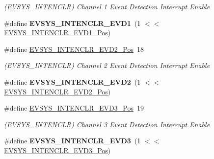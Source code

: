 \begin{DoxyCompactItemize}
\begin{DoxyCompactList}\small\item\em (E\+V\+S\+Y\+S\+\_\+\+I\+N\+T\+E\+N\+C\+L\+R) Channel 1 Event Detection Interrupt Enable \end{DoxyCompactList}\item 
\hypertarget{group___s_a_m_l21___e_v_s_y_s_ga459758c1f1e6bd8a40bab3d9caa23ec8}{}\#define {\bfseries E\+V\+S\+Y\+S\+\_\+\+I\+N\+T\+E\+N\+C\+L\+R\+\_\+\+E\+V\+D1}~(1 $<$$<$ \hyperlink{group___s_a_m_l21___e_v_s_y_s_gabd12d170f66f38972e54314834495117}{E\+V\+S\+Y\+S\+\_\+\+I\+N\+T\+E\+N\+C\+L\+R\+\_\+\+E\+V\+D1\+\_\+\+Pos})\label{group___s_a_m_l21___e_v_s_y_s_ga459758c1f1e6bd8a40bab3d9caa23ec8}

\item 
\hypertarget{group___s_a_m_l21___e_v_s_y_s_ga532eeca3a85b502003b28b968ac30625}{}\#define \hyperlink{group___s_a_m_l21___e_v_s_y_s_ga532eeca3a85b502003b28b968ac30625}{E\+V\+S\+Y\+S\+\_\+\+I\+N\+T\+E\+N\+C\+L\+R\+\_\+\+E\+V\+D2\+\_\+\+Pos}~18\label{group___s_a_m_l21___e_v_s_y_s_ga532eeca3a85b502003b28b968ac30625}

\begin{DoxyCompactList}\small\item\em (E\+V\+S\+Y\+S\+\_\+\+I\+N\+T\+E\+N\+C\+L\+R) Channel 2 Event Detection Interrupt Enable \end{DoxyCompactList}\item 
\hypertarget{group___s_a_m_l21___e_v_s_y_s_gaca8fe60ce667ef8c386033913db0cdb6}{}\#define {\bfseries E\+V\+S\+Y\+S\+\_\+\+I\+N\+T\+E\+N\+C\+L\+R\+\_\+\+E\+V\+D2}~(1 $<$$<$ \hyperlink{group___s_a_m_l21___e_v_s_y_s_ga532eeca3a85b502003b28b968ac30625}{E\+V\+S\+Y\+S\+\_\+\+I\+N\+T\+E\+N\+C\+L\+R\+\_\+\+E\+V\+D2\+\_\+\+Pos})\label{group___s_a_m_l21___e_v_s_y_s_gaca8fe60ce667ef8c386033913db0cdb6}

\item 
\hypertarget{group___s_a_m_l21___e_v_s_y_s_ga9b3a9f98637dea0c9a77145a85c39149}{}\#define \hyperlink{group___s_a_m_l21___e_v_s_y_s_ga9b3a9f98637dea0c9a77145a85c39149}{E\+V\+S\+Y\+S\+\_\+\+I\+N\+T\+E\+N\+C\+L\+R\+\_\+\+E\+V\+D3\+\_\+\+Pos}~19\label{group___s_a_m_l21___e_v_s_y_s_ga9b3a9f98637dea0c9a77145a85c39149}

\begin{DoxyCompactList}\small\item\em (E\+V\+S\+Y\+S\+\_\+\+I\+N\+T\+E\+N\+C\+L\+R) Channel 3 Event Detection Interrupt Enable \end{DoxyCompactList}\item 
\hypertarget{group___s_a_m_l21___e_v_s_y_s_ga39b454990e99af899238a7d8c5ecf0dc}{}\#define {\bfseries E\+V\+S\+Y\+S\+\_\+\+I\+N\+T\+E\+N\+C\+L\+R\+\_\+\+E\+V\+D3}~(1 $<$$<$ \hyperlink{group___s_a_m_l21___e_v_s_y_s_ga9b3a9f98637dea0c9a77145a85c39149}{E\+V\+S\+Y\+S\+\_\+\+I\+N\+T\+E\+N\+C\+L\+R\+\_\+\+E\+V\+D3\+\_\+\+Pos})\label{group___s_a_m_l21___e_v_s_y_s_ga39b454990e99af899238a7d8c5ecf0dc}


\end{DoxyCompactItemize}

